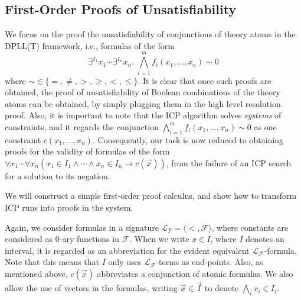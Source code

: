\documentclass[envcountsect]{llncs}
\begin{document}
\subsection{First-Order Proofs of Unsatisfiability}

We focus on the proof the unsatisfiability of conjunctions of theory
atoms in the DPLL(T) framework, i.e., formulas of the form
$$\exists^{I_1} x_1\cdots \exists^{I_n} x_n.\; \bigwedge_{i=1}^m
f_i(x_1,...,x_n)\sim 0$$
where $\sim \in \{=,\neq, >, \geq, <, \leq\}$. It is clear that once such
proofs are obtained, the proof of unsatisfiability of Boolean combinations of
the theory atoms can be obtained, by simply plugging them in the high level 
resolution proof. Also, it is important to note that the ICP algorithm solves
{\em systems} of constraints, and it regards the conjunction $\bigwedge_{i=1}^m
f_i(x_1,...,x_n)\sim 0$ as one constraint $c(x_1,...,x_n)$. Consequently, our
task is now reduced to obtaining proofs for the validity of formulas of the form
$\forall x_1 \cdots \forall x_n (x_1\in I_1\wedge \cdots \wedge x_n\in I_n
\rightarrow c(\vec x))$, from the failure of an ICP
search for a solution to its negation. 

We will construct a simple first-order proof calculus, and show how to
transform ICP runs into proofs in the system. 

Again, we consider formulas in a signature $\mathcal{L}_F = \langle <,
\mathcal{F} \rangle$, where constants are considered as 0-ary functions in
$\mathcal{F}$. When we write $x\in I$, where $I$ denotes an
interval, it is regarded as an abbreviation for the evident
equivalent $\mathcal{L}_\mathcal{F}$-formula. Note that this means that $I$ only
uses $\mathcal{L}_{\mathcal{F}}$-terms as end-points. Also, as mentioned above,
$c(\vec x)$ abbreviates a conjunction of atomic formulas. We also allow the use
of vectors in the formulas, writing $\vec x\in \vec I$ to denote $\bigwedge_i
x_i\in I_i$. 
\end{document}
